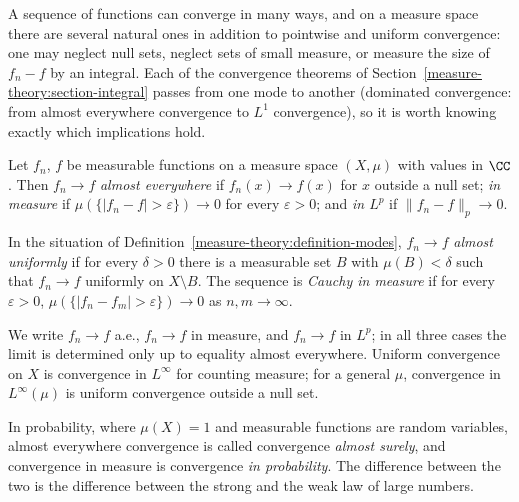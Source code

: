 A sequence of functions can converge in many ways, and on a measure space there are several natural ones in addition to pointwise and uniform convergence: one may neglect null sets, neglect sets of
small measure, or measure the size of $f_n - f$ by an integral. Each of the convergence theorems of Section~\ref{measure-theory:section-integral} passes from one mode to another (dominated
convergence: from almost everywhere convergence to $L^1$ convergence), so it is worth knowing exactly which implications hold.

\begin{definition}\label{measure-theory:definition-modes}
Let $f_n$, $f$ be measurable functions on a measure space $(X, \mu)$ with values in $\CC$. Then $f_n \to f$ \emph{almost everywhere} if $f_n(x) \to f(x)$ for $x$ outside a null set; \emph{in measure} if
$\mu(\{|f_n - f| > \varepsilon\}) \to 0$ for every $\varepsilon > 0$; and \emph{in $L^p$} if $\|f_n - f\|_p \to 0$.
\end{definition}

\begin{definition}\label{measure-theory:definition-almost-uniform}
In the situation of Definition~\ref{measure-theory:definition-modes}, $f_n \to f$ \emph{almost uniformly} if for every $\delta > 0$ there is a measurable set $B$ with $\mu(B) < \delta$ such that
$f_n \to f$ uniformly on $X \setminus B$. The sequence is \emph{Cauchy in measure} if for every $\varepsilon > 0$, $\mu(\{|f_n - f_m| > \varepsilon\}) \to 0$ as $n, m \to \infty$.
\end{definition}

\begin{notation}\label{measure-theory:notation-modes}
We write $f_n \to f$ a.e., $f_n \to f$ in measure, and $f_n \to f$ in $L^p$; in all three cases the limit is determined only up to equality almost everywhere. Uniform convergence on $X$ is convergence in $L^\infty$ for counting measure; for a general $\mu$,
convergence in $L^\infty(\mu)$ is uniform convergence outside a null set.
\end{notation}

In probability, where $\mu(X) = 1$ and measurable functions are random variables, almost everywhere convergence is called convergence \emph{almost surely}, and convergence in measure is
convergence \emph{in probability}. The difference between the two is the difference between the strong and the weak law of large numbers.

